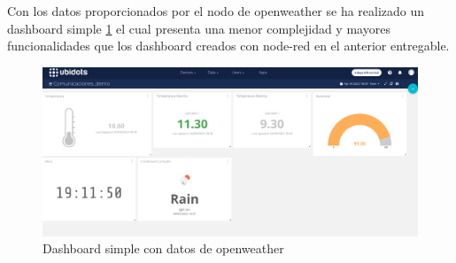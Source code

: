 \documentclass[11pt, letterpaper]{article}
\begin{document}
Con los datos proporcionados por el nodo de openweather se ha realizado un dashboard simple \ref{fig:dashboard_ejemplo}
el cual presenta una menor complejidad y mayores funcionalidades que los dashboard creados con node-red 
en el anterior entregable.
\pagebreak
\begin{figure}[h]
    \centering
    \includegraphics[width=\textwidth]{dashboard_ejemplo.png}
    \caption{Dashboard simple con datos de openweather}
    \label{fig:dashboard_ejemplo}
\end{figure}
\end{document}
